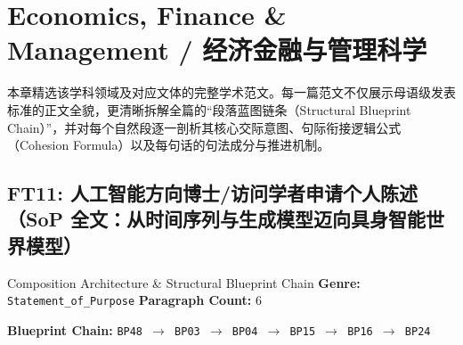 \chapter{Economics, Finance \& Management / 经济金融与管理科学}\label{ch:anthology_20}
本章精选该学科领域及对应文体的完整学术范文。每一篇范文不仅展示母语级发表标准的正文全貌，更清晰拆解全篇的“段落蓝图链条（Structural Blueprint Chain）”，并对每个自然段逐一剖析其核心交际意图、句际衔接逻辑公式（Cohesion Formula）以及每句话的句法成分与推进机制。

\section{FT11: 人工智能方向博士/访问学者申请个人陈述（SoP 全文：从时间序列与生成模型迈向具身智能世界模型）}\label{comp:FT11}
\begin{ConceptBox}{Composition Architecture \& Structural Blueprint Chain}
\textbf{Genre:} \texttt{Statement\_of\_Purpose} \quad \textbf{Paragraph Count:} 6\par
\textbf{Blueprint Chain:} \texttt{BP48 $\to$ BP03 $\to$ BP04 $\to$ BP15 $\to$ BP16 $\to$ BP24}
\end{ConceptBox}
